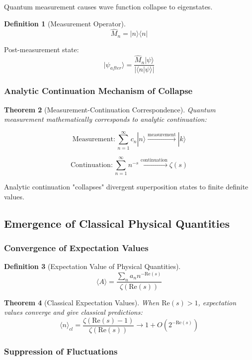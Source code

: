 \documentclass[11pt]{article}
\theoremstyle{plain}
\newtheorem{theorem}{Theorem}[section]
\theoremstyle{definition}
\newtheorem{definition}[theorem]{Definition}
\theoremstyle{remark}
\begin{document}
Quantum measurement causes wave function collapse to eigenstates.

\begin{definition}[Measurement Operator]
$$\hat{M}_n = |n\rangle\langle n|$$
\end{definition}

Post-measurement state:
$$|\psi_{after}\rangle = \frac{\hat{M}_n |\psi\rangle}{|\langle n|\psi\rangle|}$$

\subsubsection{Analytic Continuation Mechanism of Collapse}

\begin{theorem}[Measurement-Continuation Correspondence]
Quantum measurement mathematically corresponds to analytic continuation:

$$\text{Measurement}: \sum_{n=1}^{\infty} c_n |n\rangle \xrightarrow{\text{measurement}} |k\rangle$$

$$\text{Continuation}: \sum_{n=1}^{\infty} n^{-s} \xrightarrow{\text{continuation}} \zeta(s)$$
\end{theorem}

Analytic continuation "collapses" divergent superposition states to finite definite values.

\subsection{Emergence of Classical Physical Quantities}

\subsubsection{Convergence of Expectation Values}

\begin{definition}[Expectation Value of Physical Quantities]
$$\langle A \rangle = \frac{\sum_{n} a_n n^{-\text{Re}(s)}}{\zeta(\text{Re}(s))}$$
\end{definition}

\begin{theorem}[Classical Expectation Values]
When $\text{Re}(s) > 1$, expectation values converge and give classical predictions:
$$\langle n \rangle_{cl} = \frac{\zeta(\text{Re}(s)-1)}{\zeta(\text{Re}(s))} \to 1 + O(2^{-\text{Re}(s)})$$
\end{theorem}

\subsubsection{Suppression of Fluctuations}
\end{document}
